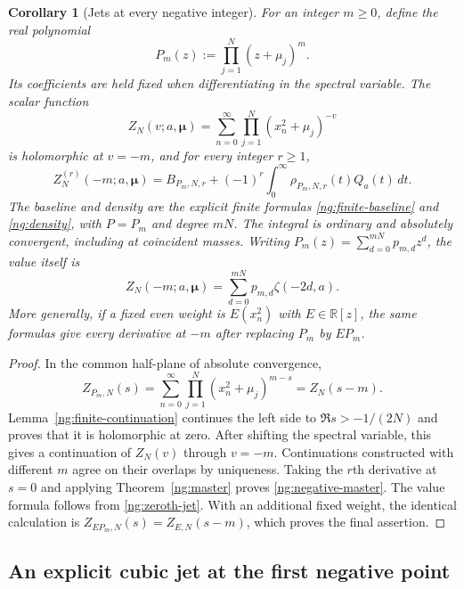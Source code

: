 \documentclass[11pt,letterpaper]{article}
\numberwithin{equation}{section}
\newtheorem{corollary}[theorem]{Corollary}
\theoremstyle{definition}
\theoremstyle{remark}
\begin{document}
\begin{corollary}[Jets at every negative integer]
\label{ng:negative-integers}
For an integer $m\geq0$, define the real polynomial
\begin{equation}
 P_m(z):=\prod_{j=1}^{N}(z+\mu_j)^m.
 \label{ng:negative-weight}
\end{equation}
Its coefficients are held fixed when differentiating in the
spectral variable.  The scalar function
\[
 Z_N(v;a,\boldsymbol\mu)
   =\sum_{n=0}^{\infty}\prod_{j=1}^{N}(x_n^2+\mu_j)^{-v}
\]
is holomorphic at $v=-m$, and for every integer $r\geq1$,
\begin{equation}
 \boxed{\displaystyle
 Z_N^{(r)}(-m;a,\boldsymbol\mu)
 =B_{P_m,N,r}
       +(-1)^r\int_0^{\infty}\rho_{P_m,N,r}(t)Q_a(t)\,dt.}
 \label{ng:negative-master}
\end{equation}
The baseline and density are the explicit finite formulas
\eqref{ng:finite-baseline} and \eqref{ng:density}, with
$P=P_m$ and degree $mN$.  The integral is ordinary and absolutely
convergent, including at coincident masses.
Writing $P_m(z)=\sum_{d=0}^{mN}p_{m,d}z^d$, the value itself is
\begin{equation}
 Z_N(-m;a,\boldsymbol\mu)
       =\sum_{d=0}^{mN}p_{m,d}\zeta(-2d,a).
 \label{ng:negative-value}
\end{equation}
More generally, if a fixed even weight is $E(x_n^2)$ with
$E\in\mathbb R[z]$, the same formulas give every derivative at
$-m$ after replacing $P_m$ by $E P_m$.
\end{corollary}

\begin{proof}
In the common half-plane of absolute convergence,
\[
 Z_{P_m,N}(s)
 =\sum_{n=0}^{\infty}\prod_{j=1}^{N}
                      (x_n^2+\mu_j)^{m-s}
 =Z_N(s-m).
\]
Lemma~\ref{ng:finite-continuation} continues the left side to
$\Re s>-1/(2N)$ and proves that it is holomorphic at zero.
After shifting the spectral variable, this gives a continuation
of $Z_N(v)$ through $v=-m$.  Continuations constructed with
different $m$ agree on their overlaps by uniqueness.
Taking the $r$th derivative at $s=0$ and applying
Theorem~\ref{ng:master} proves \eqref{ng:negative-master}.
The value formula follows from \eqref{ng:zeroth-jet}.
With an additional fixed weight, the identical calculation is
$Z_{E P_m,N}(s)=Z_{E,N}(s-m)$, which proves the final assertion.
\end{proof}

\subsection{An explicit cubic jet at the first negative point}
\label{ng:cubic-example-subsection}
\end{document}
